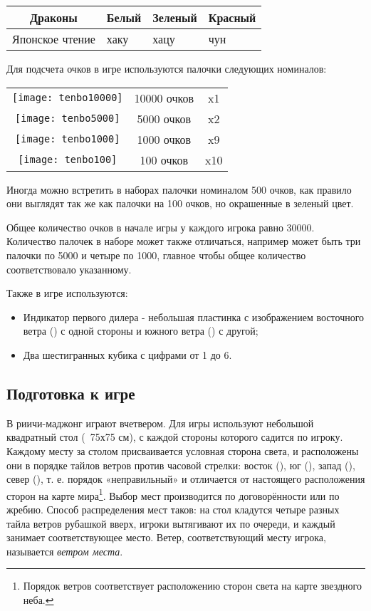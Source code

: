 \begin{tabular}{ |c|C{2cm}|C{2cm}|C{2cm}| } 
	\hline
	 \rule[0ex]{0pt}{7ex} Драконы &  \newline Белый &  \newline Зеленый &  \newline Красный \\
	\hline
	Японское чтение & хаку & хацу & чун \\
	\hline
\end{tabular}

Для подсчета очков в игре используются палочки следующих номиналов:

\begin{tabular}{ |c|c|c| } 
	\hline
	\texttt{[image: tenbo10000]} & 10000 очков & x1 \\
	\texttt{[image: tenbo5000]} & 5000 очков & x2 \\
	\texttt{[image: tenbo1000]} & 1000 очков & x9 \\
	\texttt{[image: tenbo100]} & 100 очков & x10 \\
	\hline
\end{tabular}

Иногда можно встретить в наборах палочки номиналом 500 очков, как правило они выглядят так же как палочки на 100 очков, но окрашенные в зеленый цвет.

Общее количество очков в начале игры у каждого игрока равно 30000. Количество палочек в наборе может также отличаться, например может быть три палочки по 5000 и четыре по 1000, главное чтобы общее количество соответствовало указанному.

Также в игре используются:
\begin{itemize}
	\item Индикатор первого дилера - небольшая пластинка с изображением восточного ветра () с одной стороны и южного ветра () с другой;
	\item Два шестигранных кубика с цифрами от 1 до 6.
\end{itemize}

\subsection{Подготовка к игре}

В риичи-маджонг играют вчетвером. Для игры используют небольшой квадратный стол (~75х75 см), с каждой стороны которого садится по игроку. Каждому месту за столом присваивается условная сторона света, и расположены они в порядке тайлов ветров против часовой стрелки: восток (), юг (), запад (), север (), т. е. порядок «неправильный» и отличается от настоящего расположения сторон на карте мира\footnote{Порядок ветров соответствует расположению сторон света на карте звездного неба.}. Выбор мест производится по договорённости или по жребию. Способ распределения мест таков: на стол кладутся четыре разных тайла ветров рубашкой вверх, игроки вытягивают их по очереди, и каждый занимает соответствующее место. Ветер, соответствующий месту игрока, называется \textit{ветром места}. 


